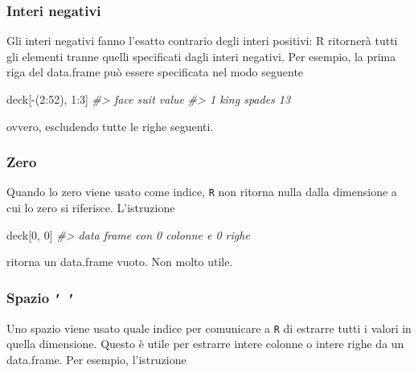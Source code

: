 \documentclass[
]{memoir}
\newenvironment{Shaded}{\begin{snugshade}}{\end{snugshade}}
\newcommand{\CommentTok}[1]{\textcolor[rgb]{0.56,0.35,0.01}{\textit{#1}}}
\newcommand{\DecValTok}[1]{\textcolor[rgb]{0.00,0.00,0.81}{#1}}
\newcommand{\NormalTok}[1]{#1}
\newcommand{\SpecialCharTok}[1]{\textcolor[rgb]{0.00,0.00,0.00}{#1}}
\theoremstyle{definition}
\theoremstyle{definition}
\theoremstyle{definition}
\theoremstyle{definition}
\theoremstyle{remark}
\begin{document}
\hypertarget{interi-negativi}{%
\subsubsection{Interi negativi}\label{interi-negativi}}

Gli interi negativi fanno l'esatto contrario degli interi positivi: R
ritornerà tutti gli elementi tranne quelli specificati dagli interi
negativi. Per esempio, la prima riga del data.frame può essere
specificata nel modo seguente

\begin{Shaded}
\begin{Highlighting}[]
\NormalTok{deck[}\SpecialCharTok{{-}}\NormalTok{(}\DecValTok{2}\SpecialCharTok{:}\DecValTok{52}\NormalTok{), }\DecValTok{1}\SpecialCharTok{:}\DecValTok{3}\NormalTok{]}
\CommentTok{\#\textgreater{}   face   suit value}
\CommentTok{\#\textgreater{} 1 king spades    13}
\end{Highlighting}
\end{Shaded}

ovvero, escludendo tutte le righe seguenti.

\hypertarget{zero}{%
\subsubsection{Zero}\label{zero}}

Quando lo zero viene usato come indice, \texttt{R} non ritorna nulla dalla
dimensione a cui lo zero si riferisce. L'istruzione

\begin{Shaded}
\begin{Highlighting}[]
\NormalTok{deck[}\DecValTok{0}\NormalTok{, }\DecValTok{0}\NormalTok{]}
\CommentTok{\#\textgreater{} data frame con 0 colonne e 0 righe}
\end{Highlighting}
\end{Shaded}

ritorna un data.frame vuoto. Non molto utile.

\hypertarget{spazio}{%
\subsubsection{\texorpdfstring{Spazio \texttt{’\ ’}}{Spazio ' '}}\label{spazio}}

Uno spazio viene usato quale indice per comunicare a \texttt{R} di estrarre
tutti i valori in quella dimensione. Questo è utile per estrarre intere
colonne o intere righe da un data.frame. Per esempio, l'istruzione
\end{document}
